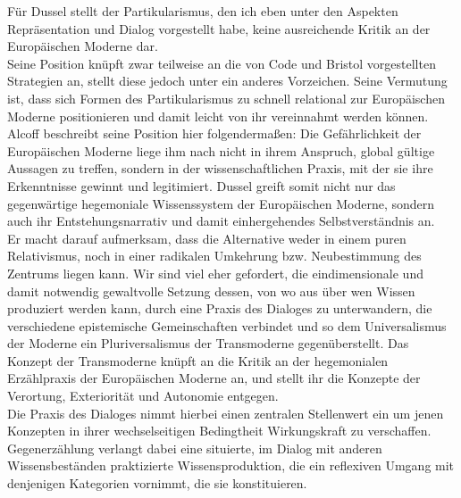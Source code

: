 Für Dussel stellt der Partikularismus, den ich eben unter den Aspekten
Repräsentation und Dialog vorgestellt habe, keine ausreichende Kritik an der
Europäischen Moderne dar. \\
Seine Position knüpft zwar teilweise an die von Code
und Bristol vorgestellten Strategien an, stellt diese jedoch unter ein anderes
Vorzeichen. Seine Vermutung ist, dass sich Formen des Partikularismus zu schnell
relational zur Europäischen Moderne positionieren und damit leicht von ihr
vereinnahmt werden können. Alcoff beschreibt seine Position hier folgendermaßen:
Die Gefährlichkeit der Europäischen Moderne liege ihm nach nicht in ihrem
Anspruch, global gültige Aussagen zu treffen, sondern in der wissenschaftlichen
Praxis, mit der sie ihre Erkenntnisse gewinnt und legitimiert.\footnotemark
{} Dussel greift somit nicht
nur das gegenwärtige hegemoniale Wissenssystem der Europäischen Moderne, sondern
auch ihr Entstehungsnarrativ und damit einhergehendes Selbstverständnis an.\\

\noindent Er macht darauf aufmerksam, dass die Alternative weder in einem puren
Relativismus, noch in einer radikalen Umkehrung bzw. Neubestimmung des Zentrums
liegen kann. Wir sind viel eher gefordert, die eindimensionale und damit
notwendig gewaltvolle Setzung dessen, von wo aus über wen Wissen produziert
werden kann, durch eine Praxis des Dialoges zu unterwandern, die verschiedene
epistemische Gemeinschaften verbindet und so dem Universalismus der Moderne ein
Pluriversalismus der Transmoderne gegenüberstellt. Das Konzept der Transmoderne
knüpft an die Kritik an der hegemonialen Erzählpraxis der Europäischen Moderne
an, und stellt ihr die Konzepte der Verortung, Exteriorität und Autonomie
entgegen. \\
Die Praxis des Dialoges nimmt hierbei einen zentralen Stellenwert ein
um jenen Konzepten in ihrer wechselseitigen Bedingtheit Wirkungskraft zu
verschaffen. Gegenerzählung verlangt dabei eine situierte, im Dialog mit anderen
Wissensbeständen praktizierte Wissensproduktion, die ein reflexiven Umgang mit
denjenigen Kategorien vornimmt, die sie konstituieren.\footnotemark{}\\

